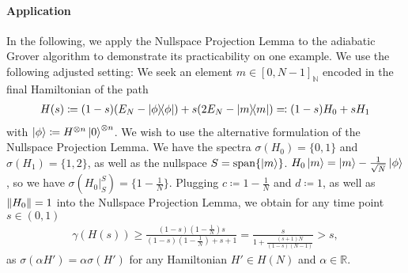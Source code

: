 \documentclass[10pt]{amsart}
\theoremstyle{definition}
\theoremstyle{remark}
\begin{document}
    \paragraph*{\textbf{Application}} In the following, we apply the Nullspace Projection Lemma to the adiabatic Grover algorithm \cite[pp. 8-10]{Albash_2018} to demonstrate its practicability on one example. We use the following adjusted setting: We seek an element \(m \in [0, N-1]_{\mathbb{N}}\) encoded in the final Hamiltonian of the path
    \begin{align}
        H(s) \coloneqq (1-s)(E_N-\ketbra{\phi}{\phi})+s(2E_N-\ketbra{m}{m}) \eqqcolon (1-s) H_0 + s H_1
    \end{align}
    with \(\ket{\phi} \coloneqq H^{\otimes n}\ket{0}^{\otimes n}\). We wish to use the alternative formulation of the Nullspace Projection Lemma. We have the spectra \(\sigma(H_0) = \{0, 1\}\) and \(\sigma(H_1) = \{1, 2\}\), as well as the nullspace \(S = \text{span}\{\ket{m}\}\). \(H_0\ket{m} = \ket{m} - \frac{1}{\sqrt{N}} \ket{\phi}\), so we have \(\sigma(H_0|_S^S) = \{1-\frac{1}{N}\}\). Plugging \(c \coloneqq 1-\frac{1}{N}\) and \(d \coloneqq 1\), as well as \(\norm{H_0} = 1\) into the Nullspace Projection Lemma, we obtain for any time point \(s \in (0, 1)\)
    \begin{align}
        \gamma(H(s)) \geq \frac{(1-s)\left(1-\frac{1}{N}\right)s}{(1-s)\left(1-\frac{1}{N}\right)+s+1} = \frac{s}{1+\frac{(s+1)N}{(1-s)(N-1)}} > s,
    \end{align}
    as \(\sigma(\alpha H') = \alpha \sigma(H')\) for any Hamiltonian \(H' \in H(N)\) and \(\alpha \in \mathbb{R}\).

    \printbibliography{}
\end{document}
